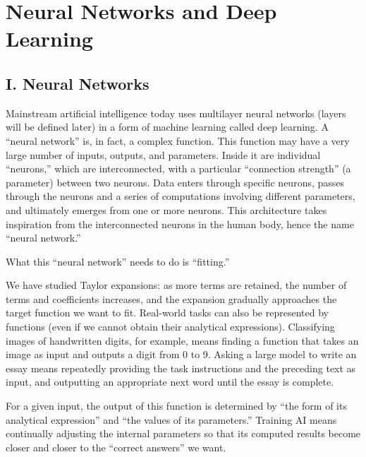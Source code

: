 \setcounter{section}{1}

\hypertarget{neural-networks-and-deep-learning}{%
\section{Neural Networks and Deep Learning}\label{neural-networks-and-deep-learning}}

\hypertarget{i.-neural-networks}{%
\subsection{I. Neural Networks}\label{i.-neural-networks}}

Mainstream artificial intelligence today uses multilayer neural networks (layers will be defined later) in a form of machine learning called deep learning. A ``neural network'' is, in fact, a complex function. This function may have a very large number of inputs, outputs, and parameters. Inside it are individual ``neurons,'' which are interconnected, with a particular ``connection strength'' (a parameter) between two neurons. Data enters through specific neurons, passes through the neurons and a series of computations involving different parameters, and ultimately emerges from one or more neurons. This architecture takes inspiration from the interconnected neurons in the human body, hence the name ``neural network.''

What this ``neural network'' needs to do is ``fitting.''

We have studied Taylor expansions: as more terms are retained, the number of terms and coefficients increases, and the expansion gradually approaches the target function we want to fit. Real-world tasks can also be represented by functions (even if we cannot obtain their analytical expressions). Classifying images of handwritten digits, for example, means finding a function that takes an image as input and outputs a digit from 0 to 9. Asking a large model to write an essay means repeatedly providing the task instructions and the preceding text as input, and outputting an appropriate next word until the essay is complete.

For a given input, the output of this function is determined by ``the form of its analytical expression'' and ``the values of its parameters.'' Training AI means continually adjusting the internal parameters so that its computed results become closer and closer to the ``correct answers'' we want.

